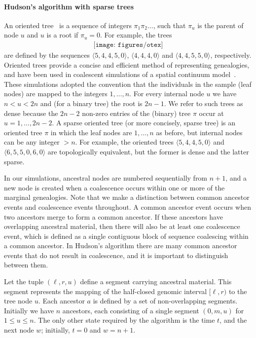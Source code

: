 \documentclass[10pt,letterpaper]{article}
\begin{document}
\paragraph*{Hudson's algorithm with sparse trees}
\label{sec-simulation-algorithm}

An oriented tree~\cite[p.\ 461]{k11} is a sequence  of integers
$\pi_1\pi_2\dots$, such that $\pi_u$ is the parent of node
$u$ and $u$ is a root if $\pi_u = 0$. For example, the trees
\begin{equation*}\label{eqn-otex}
\begin{array}{c}
\texttt{[image: figures/otex]}
\end{array}
\end{equation*}
are defined by the sequences $\langle 5,4,4,5,0\rangle$,
$\langle 4,4,4,0\rangle$ and $\langle 4,4,5,5,0\rangle$, respectively.
Oriented trees provide a concise and efficient method of representing
genealogies, and have been used in coalescent simulations of a spatial
continuum model~\citep{kbe13,keb14}. These simulations adopted the convention
that the individuals in the sample (leaf nodes) are mapped to the integers $1,
\dots, n$. For every internal node $u$ we have $n < u < 2n$ and (for a binary
tree) the root is $2n - 1$. We refer to such trees as dense because the $2n -
2$ non-zero entries of the (binary) tree $\pi$ occur at $u = 1, \dots, 2n - 2$. A
sparse oriented tree (or more concisely, sparse tree) is an oriented tree $\pi$
in which the leaf nodes are $1, \dots, n$ as before, but internal nodes can be
any integer $> n$. For example, the oriented trees $\langle 5,4,4,5,0\rangle$ and
$\langle 6,5,5,0,6,0\rangle$ are topologically equivalent, but the
former is dense and the latter sparse.

In our simulations, ancestral nodes are numbered sequentially from $n + 1$,
and a new node is created when a coalescence occurs within one or more of
the marginal genealogies. Note that we make a distinction between
common ancestor events and coalescence events throughout. A common ancestor
event occurs when two ancestors merge to form a common ancestor. If these
ancestors have overlapping ancestral material, then there will also be at least
one coalescence event, which is defined as a single contiguous block of sequence
coalescing within a common ancestor. In Hudson's algorithm there are many common
ancestor events that do not result in coalescence, and it is important to
distinguish between them.

Let the tuple $(\ell, r, u)$ define a segment carrying ancestral material.
This segment represents the mapping of the half-closed genomic interval $[\ell,
r)$ to the tree node $u$. Each ancestor $a$ is defined by a set of
non-overlapping segments. Initially we have $n$ ancestors, each consisting of a
single segment $(0, m, u)$ for $1 \leq u \leq n$. The only other state required
by the algorithm is the time $t$, and the next node $w$; initially, $t =
0$ and $w = n + 1$.
\end{document}
